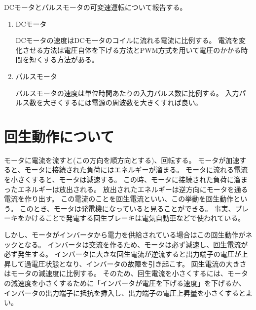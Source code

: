 \documentclass[12pt,titlepage]{ltjsarticle}
\begin{document}
DCモータとパルスモータの可変速運転について報告する。
\begin{enumerate}
\item DCモータ

DCモータの速度はDCモータのコイルに流れる電流に比例する。
電流を変化させる方法は電圧自体を下げる方法とPWM方式を用いて電圧のかかる時間を短くする方法がある。

\item パルスモータ

パルスモータの速度は単位時間あたりの入力パルス数に比例する。
入力パルス数を大きくするには電源の周波数を大きくすれば良い。

\end{enumerate}

\section{回生動作について}

モータに電流を流すと(この方向を順方向とする)、回転する。
モータが加速すると、モータに接続された負荷にはエネルギーが溜まる。
モータに流れる電流を小さくすると、モータは減速する。
この時、モータに接続された負荷に溜まったエネルギーは放出される。
放出されたエネルギーは逆方向にモータを通る電流を作り出す。
この電流のことを回生電流といい、この挙動を回生動作という。
このとき、モータは発電機になっていると見ることができる。
事実、ブレーキをかけることで発電する回生ブレーキは電気自動車などで使われている。

しかし、モータがインバータから電力を供給されている場合はこの回生動作がネックとなる。
インバータは交流を作るため、モータは必ず減速し、回生電流が必ず発生する。
インバータに大きな回生電流が逆流すると出力端子の電圧が上昇して過電圧状態となり、インバータの故障を引き起こす。
回生電流の大きさはモータの減速度に比例する。
そのため、回生電流を小さくするには、モータの減速度を小さくするために「インバータが電圧を下げる速度」を下げるか、
インバータの出力端子に抵抗を挿入し、出力端子の電圧上昇量を小さくするとよい。
\end{document}
